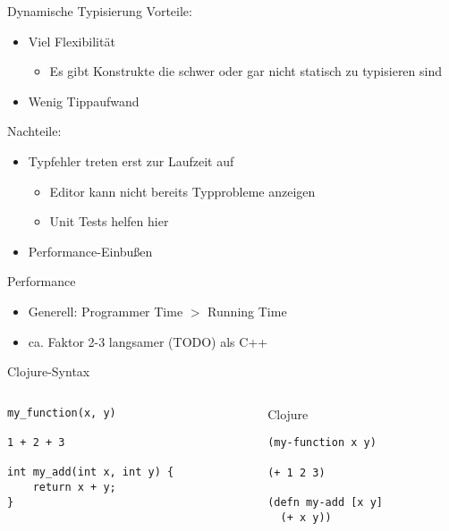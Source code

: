 \documentclass[presentation]{beamer}
\begin{document}
\begin{frame}{Dynamische Typisierung}
  Vorteile:
  \begin{itemize}
  \item Viel Flexibilität
    \begin{itemize}
    \item Es gibt Konstrukte die schwer oder gar nicht statisch zu typisieren sind
    \end{itemize}
  \item Wenig Tippaufwand
  \end{itemize}

  Nachteile:
  \begin{itemize}
  \item Typfehler treten erst zur Laufzeit auf
    \begin{itemize}
    \item Editor kann nicht bereits Typprobleme anzeigen
    \item Unit Tests helfen hier
    \end{itemize}
  \item Performance-Einbußen
  \end{itemize}
\end{frame}

\begin{frame}{Performance}
  \begin{itemize}
  \item Generell: Programmer Time $>$ Running Time
  \item ca. Faktor 2-3 langsamer (TODO) als C++
  \end{itemize}
\end{frame}

\begin{frame}[fragile]{Clojure-Syntax}
  \begin{columns}
    \begin{column}{0.5\textwidth}
      \begin{block}{\cpp}
\begin{verbatim}
my_function(x, y)

1 + 2 + 3

int my_add(int x, int y) {
    return x + y;
}
\end{verbatim}
      \end{block}
    \end{column}
    \begin{column}{0.5\textwidth}
      \begin{block}{Clojure}
\begin{verbatim}
(my-function x y)

(+ 1 2 3)

(defn my-add [x y]
  (+ x y))

\end{verbatim}
      \end{block}
    \end{column}
  \end{columns}
\end{frame}
\end{document}
